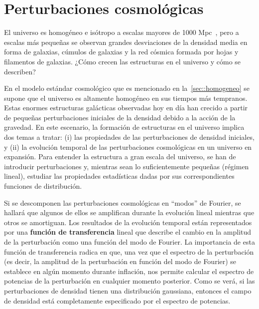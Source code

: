 \section{Perturbaciones cosmológicas}
El universo es homogéneo e isótropo a escalas mayores de 1000 Mpc~\cite{baumann2022cosmology}, pero a escalas más pequeñas se observan grandes desviaciones de la densidad media en forma de galaxias, cúmulos de galaxias y la red cósmica formada por hojas y filamentos de galaxias. ¿Cómo crecen las estructuras en el universo y cómo se describen?

En el modelo estándar cosmológico que es mencionado en la~\autoref{sec::homogeneo} se supone que el universo es altamente homogéneo en sus tiempos más tempranos. Estas enormes estructuras galácticas observadas hoy en día han crecido a partir de pequeñas perturbaciones iniciales de la densidad debido a la acción de la gravedad. En este escenario, la formación de estructuras en el universo implica dos temas a tratar: (i) las propiedades de las perturbaciones de densidad iniciales, y (ii) la evolución temporal de las perturbaciones cosmológicas en un universo en expansión. Para entender la estructura a gran escala del universo, se han de introducir perturbaciones y, mientras sean lo suficientemente pequeñas (régimen lineal), estudiar las propiedades estadísticas dadas por sus correspondientes funciones de distribución.

Si se descomponen las perturbaciones cosmológicas en ``modos'' de Fourier, se hallará que algunos de ellos se amplifican durante la evolución lineal mientras que otros se amortiguan. Los resultados de la evolución temporal están representados por una \textbf{función de transferencia} lineal que describe el cambio en la amplitud de la perturbación como una función del modo de Fourier. La importancia de esta función de transferencia radica en que, una vez que el espectro de la perturbación (es decir, la amplitud de la perturbación en función del modo de Fourier) se establece en algún momento durante inflación, nos permite calcular el espectro de potencias de la perturbación en cualquier momento posterior. Como se verá, si las perturbaciones de densidad tienen una distribución gaussiana, entonces el campo de densidad está completamente especificado por el espectro de potencias.
